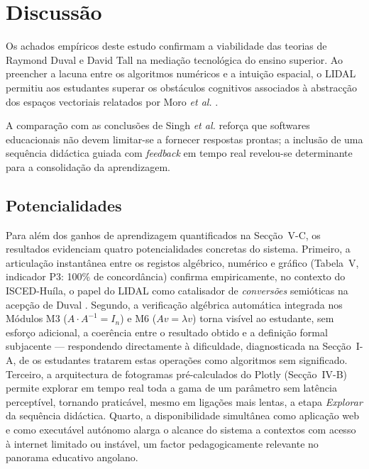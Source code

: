 \documentclass[conference]{IEEEtran}
\begin{document}
\section{Discussão}

Os achados empíricos deste estudo confirmam a viabilidade das teorias de Raymond Duval \cite{duval1995} e David Tall \cite{tall2004} na mediação tecnológica do ensino superior. Ao preencher a lacuna entre os algoritmos numéricos e a intuição espacial, o LIDAL permitiu aos estudantes superar os obstáculos cognitivos associados à abstracção dos espaços vectoriais relatados por Moro \textit{et al.} \cite{moro2016}.

A comparação com as conclusões de Singh \textit{et al.} \cite{singh2021} reforça que softwares educacionais não devem limitar-se a fornecer respostas prontas; a inclusão de uma sequência didáctica guiada com \textit{feedback} em tempo real revelou-se determinante para a consolidação da aprendizagem.

\subsection{Potencialidades}

Para além dos ganhos de aprendizagem quantificados na Secção~V-C, os resultados evidenciam quatro potencialidades concretas do sistema. Primeiro, a articulação instantânea entre os registos algébrico, numérico e gráfico (Tabela~V, indicador P3: 100\% de concordância) confirma empiricamente, no contexto do ISCED-Huíla, o papel do LIDAL como catalisador de \textit{conversões} semióticas na acepção de Duval \cite{duval1995}. Segundo, a verificação algébrica automática integrada nos Módulos M3 ($A \cdot A^{-1} = I_n$) e M6 ($Av = \lambda v$) torna visível ao estudante, sem esforço adicional, a coerência entre o resultado obtido e a definição formal subjacente --- respondendo directamente à dificuldade, diagnosticada na Secção~I-A, de os estudantes tratarem estas operações como algoritmos sem significado. Terceiro, a arquitectura de fotogramas pré-calculados do Plotly (Secção~IV-B) permite explorar em tempo real toda a gama de um parâmetro sem latência perceptível, tornando praticável, mesmo em ligações mais lentas, a etapa \textit{Explorar} da sequência didáctica. Quarto, a disponibilidade simultânea como aplicação web e como executável autónomo alarga o alcance do sistema a contextos com acesso à internet limitado ou instável, um factor pedagogicamente relevante no panorama educativo angolano.
\end{document}
